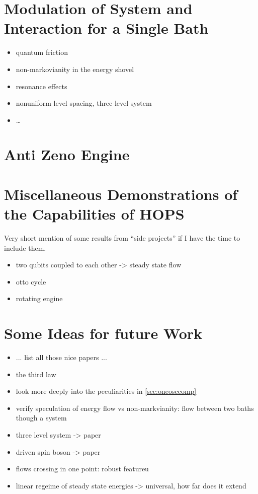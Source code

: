 

\section{Modulation of System and Interaction for a Single Bath}
\label{sec:singlemod}
\begin{itemize}
\item quantum friction
\item non-markovianity in the energy shovel
\item resonance effects
\item nonuniform level spacing, three level system
\item \ldots
\end{itemize}


\section{Anti Zeno Engine}
\label{sec:antizeno}


\section{Miscellaneous Demonstrations of the Capabilities of HOPS}
\label{sec:miscdemo}
Very short mention of some results from ``side projects'' if I have
the time to include them.

\begin{itemize}
\item two qubits coupled to each other -> steady state flow
\item otto cycle
\item rotating engine
\end{itemize}
\section{Some Ideas for future Work}
\begin{itemize}
\item ... list all those nice papers ...
\item the third law
\item look more deeply into the peculiarities in \cref{sec:oneosccomp}
\item verify speculation of energy flow vs non-markvianity: flow
  between two baths though a system
\item three level system -> paper
\item driven spin boson -> paper
\item flows crossing in one point: robust featureu
\item linear regeime of steady state energies -> universal, how far
  does it extend
\end{itemize}
